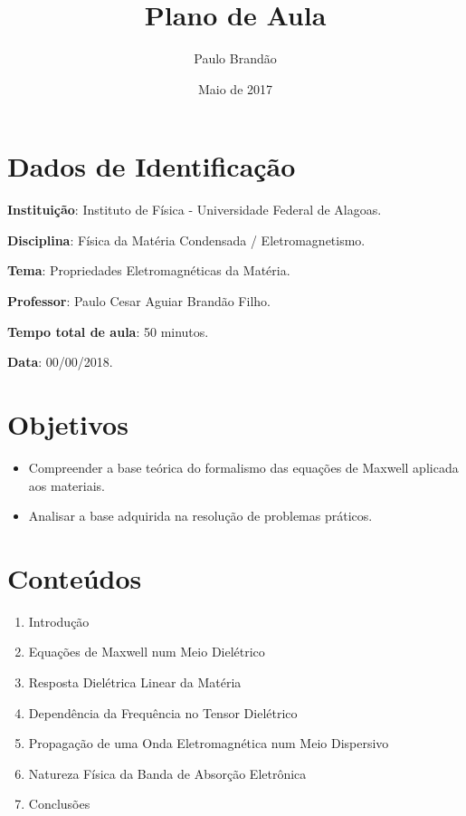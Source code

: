 \documentclass{article}
\title{\Huge\color{astral}\textbf{Plano de Aula}}
\author{Paulo Brandão}
\date{Maio de 2017}
\begin{document}
\maketitle

\section{Dados de Identificação}

\noindent \textbf{Instituição}: Instituto de Física - Universidade Federal de Alagoas.

\noindent \textbf{Disciplina}: Física da Matéria Condensada / Eletromagnetismo.

\noindent \textbf{Tema}: Propriedades Eletromagnéticas da Matéria.

\noindent \textbf{Professor}: Paulo Cesar Aguiar Brandão Filho.

\noindent \textbf{Tempo total de aula}: 50 minutos.

\noindent \textbf{Data}: 00/00/2018.

\section{Objetivos}

\begin{itemize}
    \item Compreender a base teórica do formalismo das equações de Maxwell aplicada aos materiais.
    \item Analisar a base adquirida na resolução de problemas práticos.
\end{itemize}

\section{Conteúdos}

\begin{enumerate}
    \item Introdução
    \item Equações de Maxwell num Meio Dielétrico
    \item Resposta Dielétrica Linear da Matéria
    \item Dependência da Frequência no Tensor Dielétrico
    \item Propagação de uma Onda Eletromagnética num Meio Dispersivo
    \item Natureza Física da Banda de Absorção Eletrônica
    \item Conclusões
\end{enumerate}
\end{document}
